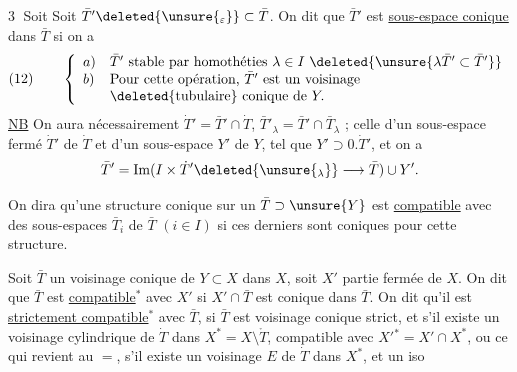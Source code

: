 \textcircled{3} Soit
Soit $\bar T'\deleted{\unsure{_\varepsilon}}\subset\bar T$.
On dit que $\bar T'$ est \uline{sous-espace conique} dans $\bar T$ si on a
\[
(12)\qquad\left\{\begin{array}{ll}
a)&\bar T'\text{ stable par homothéties }\lambda\in I\
\deleted{\unsure{\lambda\bar T'\subset\bar T'}}\\
b)&\text{Pour cette opération, }\bar T'\text{ est un voisinage}\\
&\deleted{\text{tubulaire}}\text{ conique de }Y.
\end{array}\right.
\]
\uline{NB} On aura nécessairement $\dot T'=\bar T'\cap\dot T$,
$\bar T'_\lambda=\bar T'\cap\bar T_\lambda$ ;
celle d'un sous-espace fermé $\dot T'$ de $\dot T$
et d'un sous-espace $Y'$ de $Y$, tel que $Y'\supset0.\dot T'$, et
on a
\[
\bar T'=\operatorname{Im}(I\times\dot T'
\deleted{\unsure{_\lambda}}\longrightarrow\bar T)\cup Y'.
\]

On dira qu'une structure conique sur
un $\bar T\supset\unsure{Y}$ est \uline{compatible} avec des sous-espaces
\inserted{fermés} $\bar T_i$ de $\bar T$ $(i\in I)$ si ces derniers
sont coniques pour cette structure.

Soit $\bar T$ un voisinage conique de $Y\subset X$
dans $X$, soit $X'$ partie fermée de $X$. On
dit que $\bar T$ est \uline{compatible}$^{*}$ avec $X'$ si
$X'\cap\bar T$ est conique dans $\bar T$. On dit qu'il
est \uline{strictement compatible}$^{*}$ avec $\bar T$, si
$\bar T$ est voisinage conique strict, et s'il existe
un voisinage cylindrique de $\dot T$ dans
$X^*=X\setminus\mathring T$, compatible avec
$X'{}^*=X'\cap X^*$,
ou ce qui revient au $=$, s'il existe un
voisinage $E$ de $\dot T$ dans $X^*$, et un iso

